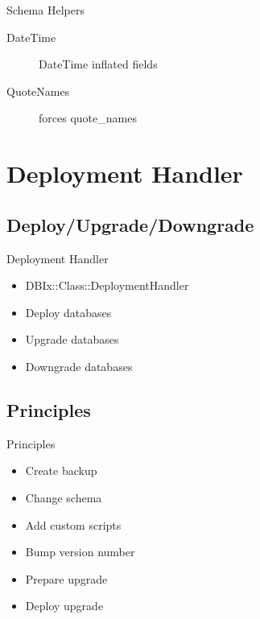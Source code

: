 \begin{frame}{Schema Helpers}
\begin{description}
\item[DateTime] DateTime inflated fields
\item[QuoteNames] forces quote\_names
\end{description}
\end{frame}


\section{Deployment Handler}

\subsection{Deploy/Upgrade/Downgrade}

\begin{frame}{Deployment Handler}
\begin{itemize}
\item DBIx::Class::DeploymentHandler
\item Deploy databases
\item Upgrade databases
\item Downgrade databases
\end{itemize}
\end{frame}

\subsection{Principles}

\begin{frame}{Principles}
\begin{itemize}
\item Create backup
\item Change schema
\item Add custom scripts
\item Bump version number
\item Prepare upgrade
\item Deploy upgrade
\end{itemize}
\end{frame}

